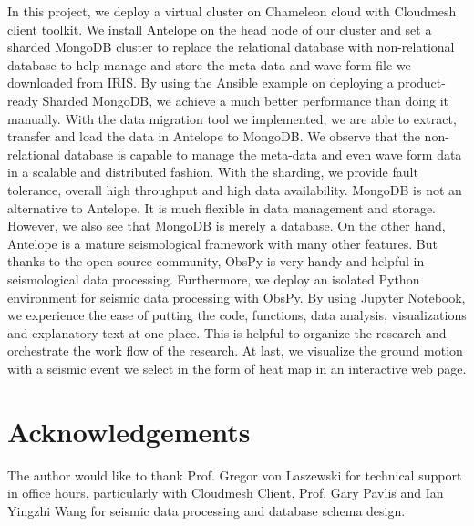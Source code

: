 \documentclass[9pt,twocolumn,twoside]{../../styles/osajnl}
\begin{document}
In this project, we deploy a virtual cluster on Chameleon cloud with Cloudmesh client toolkit. We install Antelope on the head node of our cluster and set a sharded MongoDB cluster to replace the relational database with non-relational database to help manage and store the meta-data and wave form file we downloaded from IRIS. By using the Ansible example on deploying a product-ready Sharded MongoDB, we achieve a much better performance than doing it manually. With the data migration tool we implemented, we are able to extract, transfer and load the data in Antelope to MongoDB. We observe that the non-relational database is capable to manage the meta-data and even wave form data in a scalable and distributed fashion. With the sharding, we provide fault tolerance, overall high throughput and high data availability. MongoDB is not an alternative to Antelope. It is much flexible in data management and storage. However, we also see that MongoDB is merely a database. On the other hand, Antelope is a mature seismological framework with many other features. But thanks to the open-source community, ObsPy is very handy and helpful in seismological data processing. Furthermore, we deploy an isolated Python environment for seismic data processing with ObsPy. By using Jupyter Notebook, we experience the ease of putting the code, functions, data analysis, visualizations and explanatory text at one place. This is helpful to organize the research and orchestrate the work flow of the research. At last, we visualize the ground motion with a seismic event we select in the form of heat map in an interactive web page.

\section*{Acknowledgements}

The author would like to thank Prof. Gregor von Laszewski for technical support in office hours, particularly with Cloudmesh Client, Prof. Gary Pavlis and Ian Yingzhi Wang for seismic data processing and database schema design.




\end{document}
